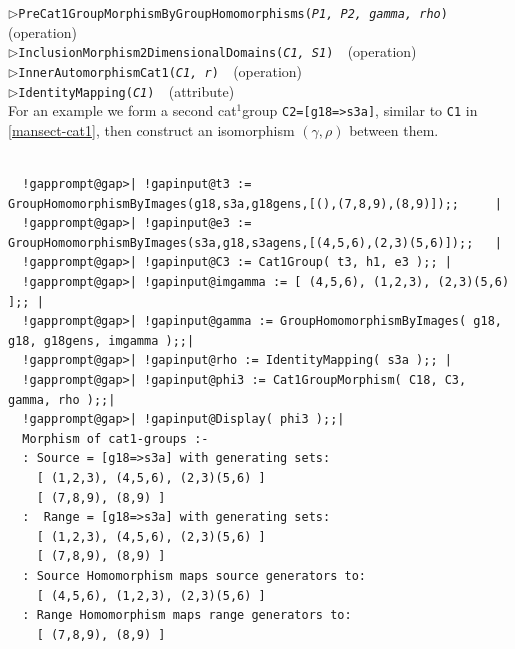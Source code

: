 \documentclass[a4paper,11pt]{report}
\begin{document}
{{{\noindent\textcolor{FuncColor}{$\triangleright$\enspace\texttt{PreCat1GroupMorphismByGroupHomomorphisms({\mdseries\slshape P1, P2, gamma, rho})
\label{PreCat1GroupMorphismByGroupHomomorphisms}
}\hfill{\scriptsize (operation)}}\\
\noindent\textcolor{FuncColor}{$\triangleright$\enspace\texttt{InclusionMorphism2DimensionalDomains({\mdseries\slshape C1, S1})
\label{InclusionMorphism2DimensionalDomains:for cat1-groups}
}\hfill{\scriptsize (operation)}}\\
\noindent\textcolor{FuncColor}{$\triangleright$\enspace\texttt{InnerAutomorphismCat1({\mdseries\slshape C1, r})
\label{InnerAutomorphismCat1}
}\hfill{\scriptsize (operation)}}\\
\noindent\textcolor{FuncColor}{$\triangleright$\enspace\texttt{IdentityMapping({\mdseries\slshape C1})
\label{IdentityMapping:for precat1-morphisms}
}\hfill{\scriptsize (attribute)}}\\


 For an example we form a second cat$^1$\texttt{}group \texttt{C2=[g18={\textgreater}s3a]}, similar to \texttt{C1} in \ref{mansect-cat1}, then construct an isomorphism $(\gamma,\rho)$ between them. }

 

 
\begin{Verbatim}[commandchars=!@|,fontsize=\small,frame=single,label=Example]
  
  !gapprompt@gap>| !gapinput@t3 := GroupHomomorphismByImages(g18,s3a,g18gens,[(),(7,8,9),(8,9)]);;     |
  !gapprompt@gap>| !gapinput@e3 := GroupHomomorphismByImages(s3a,g18,s3agens,[(4,5,6),(2,3)(5,6)]);;   |
  !gapprompt@gap>| !gapinput@C3 := Cat1Group( t3, h1, e3 );; |
  !gapprompt@gap>| !gapinput@imgamma := [ (4,5,6), (1,2,3), (2,3)(5,6) ];; |
  !gapprompt@gap>| !gapinput@gamma := GroupHomomorphismByImages( g18, g18, g18gens, imgamma );;|
  !gapprompt@gap>| !gapinput@rho := IdentityMapping( s3a );; |
  !gapprompt@gap>| !gapinput@phi3 := Cat1GroupMorphism( C18, C3, gamma, rho );;|
  !gapprompt@gap>| !gapinput@Display( phi3 );;|
  Morphism of cat1-groups :- 
  : Source = [g18=>s3a] with generating sets:
    [ (1,2,3), (4,5,6), (2,3)(5,6) ]
    [ (7,8,9), (8,9) ]
  :  Range = [g18=>s3a] with generating sets:
    [ (1,2,3), (4,5,6), (2,3)(5,6) ]
    [ (7,8,9), (8,9) ]
  : Source Homomorphism maps source generators to:
    [ (4,5,6), (1,2,3), (2,3)(5,6) ]
  : Range Homomorphism maps range generators to:
    [ (7,8,9), (8,9) ]
  

\end{Verbatim}}}
\end{document}
